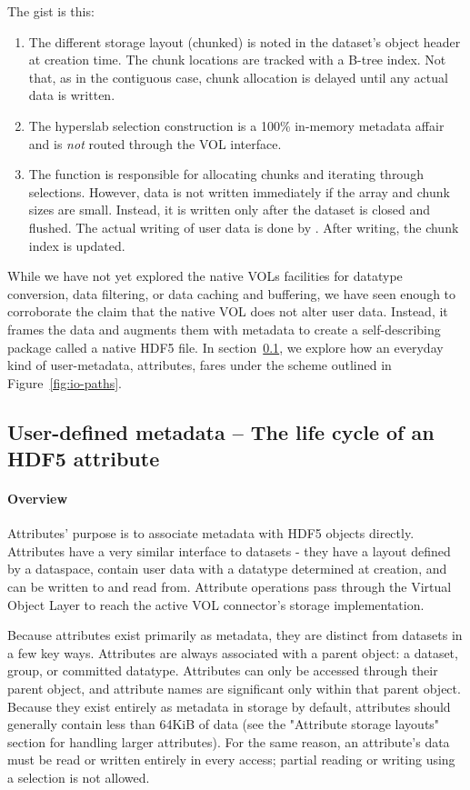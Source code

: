 The gist is this:
\begin{enumerate}
    \item The different storage layout (chunked) is noted in the dataset's object header at creation time. The chunk locations are tracked with a B-tree index. Not that, as in the contiguous case, chunk allocation is delayed until any actual data is written.
    \item The hyperslab selection construction is a 100\% in-memory metadata affair and is \textit{not} routed through the VOL interface.
    \item The function  is responsible for allocating chunks and iterating through selections. However, data is not written immediately if the array and chunk sizes are small. Instead, it is written only after the dataset is closed and flushed. The actual writing of user data is done by . After writing, the chunk index is updated.
\end{enumerate}

While we have not yet explored the native VOLs facilities for datatype conversion, data filtering, or data caching and buffering, we have seen enough to corroborate the claim that the native VOL does not alter user data. Instead, it frames the data and augments them with metadata to create a self-describing package called a native HDF5 file. In section~\ref{sec:user-metadata}, we explore how an everyday kind of user-metadata, attributes, fares under the scheme outlined in Figure~\ref{fig:io-paths}.

\subsection{User-defined metadata -- The life cycle of an HDF5 attribute}\label{sec:user-metadata}

\paragraph{Overview} Attributes' purpose is to associate metadata with HDF5 objects directly. Attributes have a very similar interface to datasets - they have a layout defined by a dataspace, contain user data with a datatype determined at creation, and can be written to and read from. Attribute operations pass through the Virtual Object Layer to reach the active VOL connector's storage implementation.

Because attributes exist primarily as metadata, they are distinct from datasets in a few key ways. Attributes are always associated with a parent object: a dataset, group, or committed datatype. Attributes can only be accessed through their parent object, and attribute names are significant only within that parent object. Because they exist entirely as metadata in storage by default, attributes should generally contain less than 64KiB of data (see the "Attribute storage layouts" section for handling larger attributes). For the same reason, an attribute's data must be read or written entirely in every access; partial reading or writing using a selection is not allowed.

